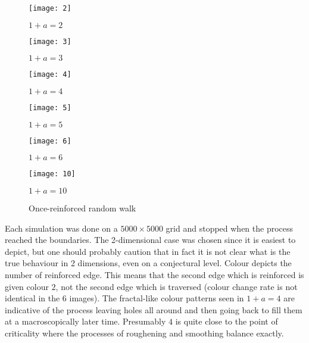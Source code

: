 \documentclass{emsprocart}
\theoremstyle{plain}
\begin{document}
\begin{figure}
\centering\begin{minipage}[t]{\figwid}\texttt{[image: 2]}

\begin{center}
$1+a=2$
\par\end{center}\end{minipage}\begin{minipage}[t]{\figwid}\texttt{[image: 3]}

\begin{center}
$1+a=3$
\par\end{center}\end{minipage}

\begin{minipage}[t]{\figwid}\texttt{[image: 4]}

\begin{center}
$1+a=4$
\par\end{center}\end{minipage}\begin{minipage}[t]{\figwid}\texttt{[image: 5]}

\begin{center}
$1+a=5$
\par\end{center}\end{minipage}

\begin{minipage}[t]{\figwid}\texttt{[image: 6]}

\begin{center}
$1+a=6$
\par\end{center}\end{minipage}\begin{minipage}[t]{\figwid}\texttt{[image: 10]}

\begin{center}
$1+a=10$
\par\end{center}\end{minipage}

\caption{\label{fig:Once}Once-reinforced random walk}
\end{figure}
 Each simulation was done on a $5000\times5000$ grid and stopped
when the process reached the boundaries. The 2-dimensional case  was chosen
since it is easiest to depict, but one should probably caution
that in fact it is not clear what is the true behaviour in 2 dimensions,
even on a conjectural level. Colour depicts the number
of reinforced edge. This means that the second edge which is reinforced
is given colour $2$, not the second edge which is traversed (colour
change rate is not identical in the 6 images). The fractal-like colour
patterns seen in $1+a=4$ are indicative of the process leaving holes
all around and then going back to fill them at a macroscopically later
time. Presumably $4$ is quite close to the point of criticality where
the processes of roughening and smoothing balance exactly. 
\end{document}
